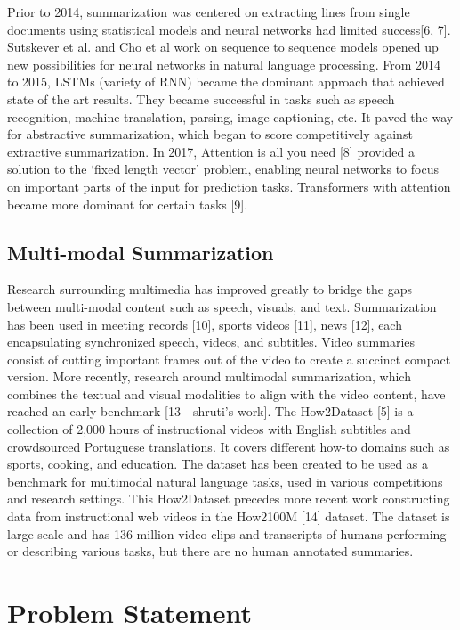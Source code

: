 \documentclass{article}
\begin{document}
Prior to 2014, summarization was centered on extracting lines from single documents using statistical models and neural networks had limited success[6, 7]. Sutskever et al. and Cho et al work on sequence to sequence models opened up new possibilities for neural networks in natural language processing. From 2014 to 2015, LSTMs (variety of RNN) became the dominant approach that achieved state of the art results. They became successful in tasks such as speech recognition, machine translation, parsing, image captioning, etc. It paved the way for abstractive summarization, which began to score competitively against extractive summarization. In 2017, Attention is all you need [8] provided a solution to the ‘fixed length vector’ problem, enabling neural networks to focus on important parts of the input for prediction tasks. Transformers with attention became more dominant for certain tasks [9].

\subsection{Multi-modal Summarization}
Research surrounding multimedia has improved greatly to bridge the gaps between multi-modal 
content such as speech, visuals, and text. Summarization has been used in meeting records [10], sports videos [11], news [12], each encapsulating synchronized speech, videos, and subtitles. Video summaries consist of cutting important frames out of the video to create a succinct compact version. More recently, research around multimodal summarization, which combines the textual and visual modalities to align with the video content, have reached an early benchmark [13 - shruti’s work]. The How2Dataset [5] is a  collection of 2,000 hours of instructional videos with English subtitles and crowdsourced Portuguese translations. It covers different how-to domains such as sports, cooking, and education. The dataset has been created to be used as a benchmark for multimodal natural language tasks, used in various competitions and research settings. This How2Dataset precedes more recent work constructing data from instructional web videos in the How2100M [14] dataset. The dataset is large-scale and has 136 million video clips and transcripts of humans performing or describing various tasks, but there are no human annotated summaries. 

\section{Problem Statement}
\end{document}
